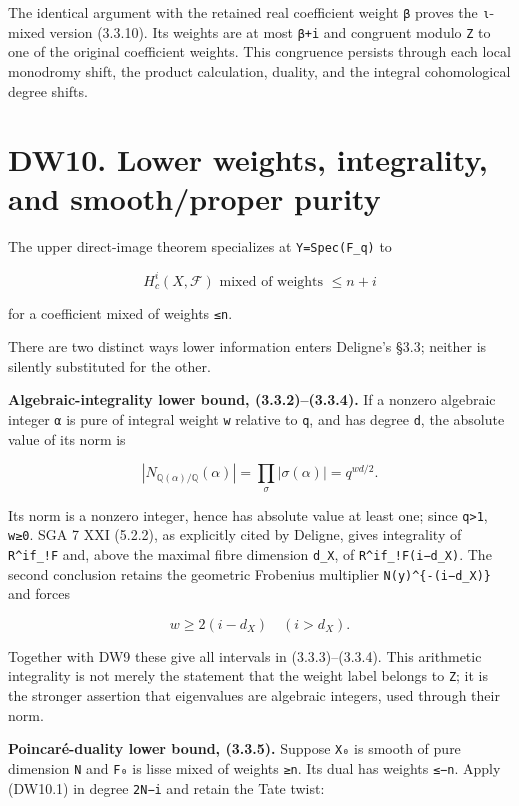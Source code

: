 \documentclass[
]{report}
\begin{document}
The identical argument with the retained real coefficient weight
\texttt{β} proves the \texttt{ι}-mixed version (3.3.10). Its weights are
at most \texttt{β+i} and congruent modulo \texttt{Z} to one of the
original coefficient weights. This congruence persists through each
local monodromy shift, the product calculation, duality, and the
integral cohomological degree shifts.

\section{DW10. Lower weights, integrality, and smooth/proper
purity}\label{dw10.-lower-weights-integrality-and-smoothproper-purity}

The upper direct-image theorem specializes at \texttt{Y=Spec(F\_q)} to

\[
H_c^i(X,\mathcal F)\text{ mixed of weights }\le n+i
\tag{DW10.1}
\]

for a coefficient mixed of weights \texttt{≤n}.

There are two distinct ways lower information enters Deligne's §3.3;
neither is silently substituted for the other.

\textbf{Algebraic-integrality lower bound, (3.3.2)--(3.3.4).} If a
nonzero algebraic integer \texttt{α} is pure of integral weight
\texttt{w} relative to \texttt{q}, and has degree \texttt{d}, the
absolute value of its norm is

\[
|N_{\mathbb Q(\alpha)/\mathbb Q}(\alpha)|
=\prod_{\sigma}|\sigma(\alpha)|=q^{wd/2}.
\tag{DW10.2}
\]

Its norm is a nonzero integer, hence has absolute value at least one;
since \texttt{q\textgreater{}1}, \texttt{w≥0}. SGA 7 XXI (5.2.2), as
explicitly cited by Deligne, gives integrality of \texttt{R\^{}if\_!F}
and, above the maximal fibre dimension \texttt{d\_X}, of
\texttt{R\^{}if\_!F(i−d\_X)}. The second conclusion retains the
geometric Frobenius multiplier \texttt{N(y)\^{}\{-(i−d\_X)\}} and forces

\[
w\ge 2(i-d_X)\quad(i>d_X).
\tag{DW10.3}
\]

Together with DW9 these give all intervals in (3.3.3)--(3.3.4). This
arithmetic integrality is not merely the statement that the weight label
belongs to \texttt{Z}; it is the stronger assertion that eigenvalues are
algebraic integers, used through their norm.

\textbf{Poincaré-duality lower bound, (3.3.5).} Suppose \texttt{X₀} is
smooth of pure dimension \texttt{N} and \texttt{F₀} is lisse mixed of
weights \texttt{≥n}. Its dual has weights \texttt{≤−n}. Apply (DW10.1)
in degree \texttt{2N−i} and retain the Tate twist:
\end{document}
